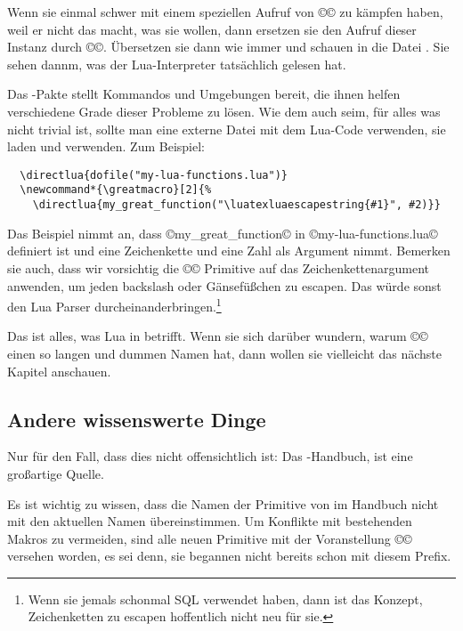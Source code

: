 \documentclass{lltxdoc}
\begin{document}
Wenn sie einmal schwer mit einem speziellen Aufruf von ©\directlua© zu kämpfen
haben, weil er nicht das macht, was sie wollen, dann ersetzen sie den Aufruf 
dieser Instanz durch ©\directluadebug©. Übersetzen sie dann wie immer und 
schauen in die Datei . Sie sehen dannm, was der Lua-Interpreter
tatsächlich gelesen hat.

Das -Pakte stellt Kommandos und Umgebungen bereit, die ihnen helfen
verschiedene Grade dieser Probleme zu lösen. Wie dem auch seim, für alles was
nicht trivial ist, sollte man eine externe Datei mit dem Lua-Code verwenden, sie 
laden und verwenden. Zum Beispiel:

\begin{Verbatim}
  \directlua{dofile("my-lua-functions.lua")}
  \newcommand*{\greatmacro}[2]{%
    \directlua{my_great_function("\luatexluaescapestring{#1}", #2)}}
\end{Verbatim}

Das Beispiel nimmt an, dass ©my_great_function© in ©my-lua-functions.lua© 
definiert ist und eine Zeichenkette und eine Zahl als Argument nimmt. Bemerken
sie auch, dass wir vorsichtig die ©\luatexluaescapestring© Primitive auf das 
Zeichenkettenargument anwenden, um jeden backslash oder Gänsefüßchen zu 
escapen. Das würde sonst den Lua Parser durcheinanderbringen.\footnote{
Wenn sie jemals schonmal SQL verwendet haben, dann ist das Konzept, 
Zeichenketten zu escapen hoffentlich nicht neu für sie.}

\medskip

Das ist alles, was Lua in \tex betrifft. Wenn sie sich darüber wundern, warum
©\luatexluaescapestring© einen so langen und dummen Namen hat, dann wollen sie
vielleicht das nächste Kapitel anschauen.

\subsection{Andere wissenswerte Dinge}\label{things}

Nur für den Fall, dass dies nicht offensichtlich ist: Das \luatex-Handbuch, 
 ist eine großartige Quelle.

Es ist wichtig zu wissen, dass die Namen der Primitive von \luatex im Handbuch
nicht mit den aktuellen Namen übereinstimmen. Um Konflikte mit bestehenden
Makros zu vermeiden, sind alle neuen Primitive mit der Voranstellung ©\luatex©
versehen worden, es sei denn, sie begannen nicht bereits schon mit diesem Prefix. 
\end{document}
